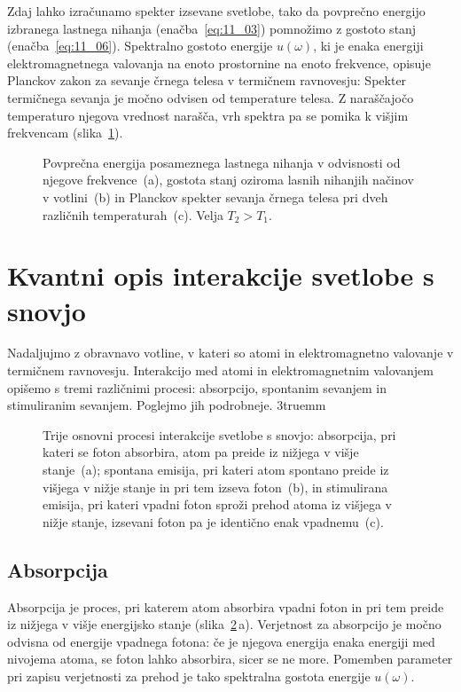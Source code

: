 Zdaj lahko izračunamo spekter izsevane svetlobe, tako da povprečno 
energijo izbranega lastnega nihanja (enačba~\ref{eq:11_03}) 
pomnožimo z gostoto stanj (enačba~\ref{eq:11_06}). 
Spektralno gostoto energije $u(\omega)$, ki je enaka energiji 
elektromagnetnega valovanja na enoto prostornine na enoto frekvence, 
opisuje Planckov zakon za sevanje črnega telesa v termičnem ravnovesju:
Spekter termičnega sevanja je močno odvisen od temperature telesa. Z naraščajočo
temperaturo njegova vrednost narašča, vrh spektra pa se pomika k višjim
frekvencam (slika~\ref{fig:11_Planck}).
\begin{figure}[h!]
\centering
\def\svgwidth{140truemm} 

\caption{Povprečna energija posameznega lastnega nihanja v odvisnosti
od njegove frekvence~(a), gostota stanj  oziroma lasnih nihanjih načinov
v votlini~(b) in Planckov spekter sevanja
črnega telesa pri dveh različnih temperaturah~(c). Velja $T_2>T_1$.
}
\label{fig:11_Planck}
\end{figure}

\section{Kvantni opis interakcije svetlobe s snovjo}
Nadaljujmo z obravnavo votline, v kateri so atomi 
in elektromagnetno valovanje v termičnem ravnovesju. 
Interakcijo med atomi in elektromagnetnim valovanjem 
opišemo s tremi različnimi procesi: absorpcijo, spontanim
sevanjem in stimuliranim sevanjem. Poglejmo jih podrobneje.
\vglue3truemm
\begin{figure}[h!]
\centering
\def\svgwidth{140truemm} 

\caption{Trije osnovni procesi interakcije svetlobe s snovjo:
absorpcija, pri kateri se foton absorbira, atom pa preide iz nižjega v višje stanje~(a); spontana emisija, pri kateri atom spontano preide iz višjega v nižje stanje in pri 
tem izseva foton~(b), in stimulirana emisija, pri kateri vpadni foton sproži prehod
atoma iz višjega v nižje stanje, izsevani foton pa je identično enak vpadnemu~(c).
}
\label{fig:11_procesi}
\end{figure}

\subsection*{Absorpcija} 
Absorpcija je proces, pri katerem atom absorbira vpadni foton in pri tem 
preide iz nižjega v višje energijsko stanje (slika~\ref{fig:11_procesi}\,a). 
Verjetnost za absorpcijo je močno odvisna od energije vpadnega fotona: če je 
njegova energija enaka energiji med nivojema atoma, se foton lahko absorbira, sicer
se ne more. Pomemben parameter pri zapisu verjetnosti za prehod je tako spektralna
gostota energije $u(\omega)$.


